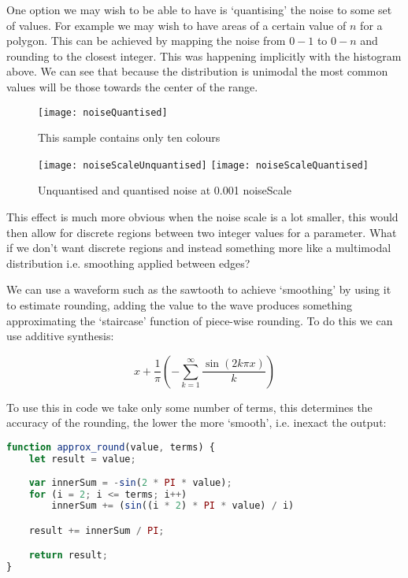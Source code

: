One option we may wish to be able to have is `quantising' the noise to some set
of values. For example we may wish to have areas of a certain value of $n$ for a
polygon. This can be achieved by mapping the noise from $0-1$ to $0-n$ and
rounding to the closest integer. This was happening implicitly with the
histogram above. We can see that because the distribution is unimodal the most
common values will be those towards the center of the range.

\begin{figure}[H]
\centering
\texttt{[image: noiseQuantised]}
\caption{This sample contains only ten colours}
\end{figure}

\begin{figure}[H]
\centering
\texttt{[image: noiseScaleUnquantised]}
\hspace{0.2cm}
\texttt{[image: noiseScaleQuantised]}
\caption{Unquantised and quantised noise at 0.001 noiseScale}
\label{0.001scale}
\end{figure}

This effect is much more obvious when the noise scale is a lot smaller, this
would then allow for discrete regions between two integer values for a
parameter. What if we don't want discrete regions and instead something more
like a multimodal distribution i.e. smoothing applied between edges?

We can use a waveform such as the sawtooth to achieve `smoothing' by using it to
estimate rounding, adding the value to the wave produces something approximating
the `staircase' function of piece-wise rounding. To do this we can use additive
synthesis:

$$x + \frac{1}{\pi} (-\sum^\infty_{k=1} \frac{\sin(2k \pi x)}{k})$$

To use this in code we take only some number of terms, this determines the
accuracy of the rounding, the lower the more `smooth', i.e. inexact the output:
\begin{lstlisting}[language=JavaScript]
function approx_round(value, terms) {
    let result = value;
    
    var innerSum = -sin(2 * PI * value);
    for (i = 2; i <= terms; i++)
        innerSum += (sin((i * 2) * PI * value) / i)

    result += innerSum / PI;

    return result;
}
\end{lstlisting}

